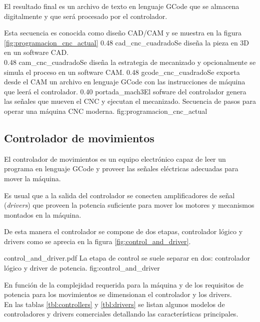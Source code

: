    El resultado final es un archivo de texto en lenguaje GCode que se almacena digitalmente y que será procesado por el controlador.\par
          Esta secuencia es conocida como diseño CAD/CAM y se muestra en la figura \ref{fig:programacion_cnc_actual}
\subfigtwotwo 
            {0.48 }{cad_cnc_cuadrado}{Se diseña la pieza en 3D en un software CAD.\\ \vphantom{1}}
            {0.48 }{cam_cnc_cuadrado}{Se diseña la estrategia de mecanizado y opcionalmente se simula el proceso en un software CAM.}
            {0.48 }{gcode_cnc_cuadrado}{Se exporta desde el CAM un archivo en lenguaje GCode con las instrucciones de máquina que leerá el controlador.}
            {0.40 }{portada_mach3}{El sofware del controlador genera las señales que mueven el CNC y ejecutan el mecanizado.}
            {Secuencia de pasos para operar una máquina CNC moderna.}
            {fig:programacion_cnc_actual}

\subsection{Controlador de movimientos}
El controlador de movimientos es un equipo electrónico capaz de leer un programa en lenguaje GCode y proveer las señales eléctricas adecuadas para mover la máquina.\par
Es usual que a la salida del controlador se conecten amplificadores de señal (\textit{drivers}) que proveen la potencia suficiente para mover los motores y mecanismos montados en la máquina.\par
De esta manera el controlador se compone de dos etapas, controlador lógico y drivers como se aprecia en la figura \ref{fig:control_and_driver}.

         {control_and_driver.pdf}
         {La etapa de control se suele separar en dos: controlador lógico y driver de potencia.}
         {fig:control_and_driver}

En función de la complejidad requerida para la máquina y de los requisitos de potencia para los movimientos se dimensionan el controlador y los drivers.\\
En las tablas \ref{tbl:controllers} y \ref{tbl:drivers} se listan algunos modelos de controladores y drivers comerciales detallando las características principales.\\

